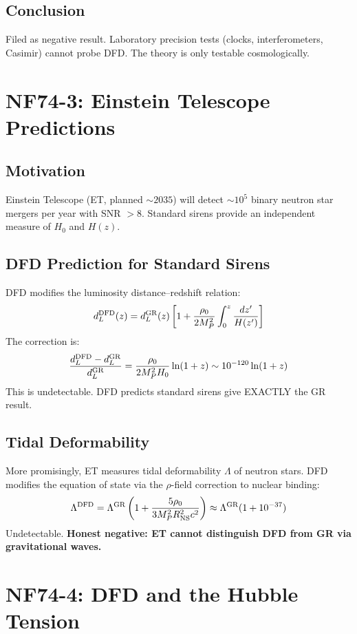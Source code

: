 \documentclass[11pt,a4paper]{article}
\begin{document}
\subsection{Conclusion}
Filed as negative result. Laboratory precision tests (clocks, interferometers, Casimir) cannot probe DFD. The theory is only testable cosmologically.

\section{NF74-3: Einstein Telescope Predictions}

\subsection{Motivation}
Einstein Telescope (ET, planned $\sim 2035$) will detect $\sim 10^5$ binary neutron star mergers per year with SNR $> 8$. Standard sirens provide an independent measure of $H_0$ and $H(z)$.

\subsection{DFD Prediction for Standard Sirens}
DFD modifies the luminosity distance--redshift relation:
\[
d_L^{\rm DFD}(z) = d_L^{\rm GR}(z)\left[1 + \frac{\rho_0}{2M_P^2}\int_0^z \frac{dz'}{H(z')}\right]
\]
The correction is:
\[
\frac{d_L^{\rm DFD} - d_L^{\rm GR}}{d_L^{\rm GR}} = \frac{\rho_0}{2M_P^2 H_0}\ln(1+z) \sim 10^{-120}\ln(1+z)
\]
This is undetectable. DFD predicts standard sirens give EXACTLY the GR result.

\subsection{Tidal Deformability}
More promisingly, ET measures tidal deformability $\Lambda$ of neutron stars. DFD modifies the equation of state via the $\rho$-field correction to nuclear binding:
\[
\Lambda^{\rm DFD} = \Lambda^{\rm GR}\left(1 + \frac{5\rho_0}{3M_P^2 R_{\rm NS}^2 c^2}\right) \approx \Lambda^{\rm GR}(1 + 10^{-37})
\]
Undetectable. \textbf{Honest negative: ET cannot distinguish DFD from GR via gravitational waves.}

\section{NF74-4: DFD and the Hubble Tension}
\end{document}
